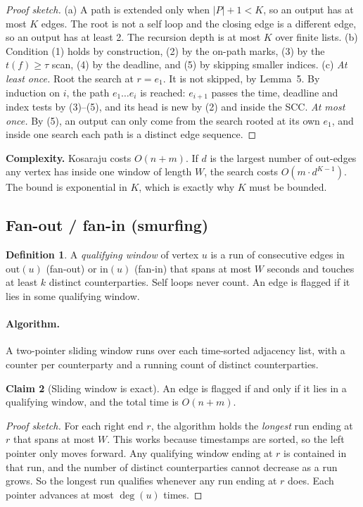 \documentclass[11pt,a4paper]{article}
\theoremstyle{definition}
\newtheorem{definition}{Definition}
\newtheorem{claim}[definition]{Claim}
\begin{document}
\begin{proof}[Proof sketch]
(a) A path is extended only when $|P| + 1 < K$, so an output has at most $K$ edges. The root is not a self loop and the closing edge is a different edge, so an output has at least 2. The recursion depth is at most $K$ over finite lists.
(b) Condition (1) holds by construction, (2) by the on-path marks, (3) by the $t(f) \ge \tau$ scan, (4) by the deadline, and (5) by skipping smaller indices.
(c) \emph{At least once.} Root the search at $r = e_1$. It is not skipped, by Lemma~5. By induction on $i$, the path $e_1\dots e_i$ is reached: $e_{i+1}$ passes the time, deadline and index tests by (3)--(5), and its head is new by (2) and inside the SCC. \emph{At most once.} By (5), an output can only come from the search rooted at its own $e_1$, and inside one search each path is a distinct edge sequence.
\end{proof}

\noindent\textbf{Complexity.} Kosaraju costs $O(n + m)$. If $d$ is the largest number of out-edges any vertex has inside one window of length $W$, the search costs $O(m \cdot d^{K-1})$. The bound is exponential in $K$, which is exactly why $K$ must be bounded.

\subsection{Fan-out / fan-in (smurfing)}
\begin{definition}
A \emph{qualifying window} of vertex $u$ is a run of consecutive edges in $\text{out}(u)$ (fan-out) or $\text{in}(u)$ (fan-in) that spans at most $W$ seconds and touches at least $k$ distinct counterparties. Self loops never count. An edge is flagged if it lies in some qualifying window.
\end{definition}

\paragraph{Algorithm.} A two-pointer sliding window runs over each time-sorted adjacency list, with a counter per counterparty and a running count of distinct counterparties.

\begin{claim}[Sliding window is exact]
An edge is flagged if and only if it lies in a qualifying window, and the total time is $O(n + m)$.
\end{claim}

\begin{proof}[Proof sketch]
For each right end $r$, the algorithm holds the \emph{longest} run ending at $r$ that spans at most $W$. This works because timestamps are sorted, so the left pointer only moves forward. Any qualifying window ending at $r$ is contained in that run, and the number of distinct counterparties cannot decrease as a run grows. So the longest run qualifies whenever any run ending at $r$ does. Each pointer advances at most $\deg(u)$ times.
\end{proof}
\end{document}
